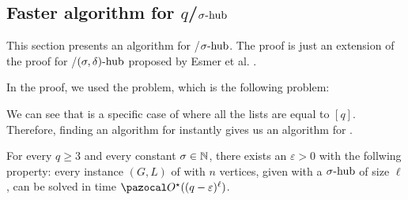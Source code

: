 \subsection{Faster algorithm for $q$/$\sigma\text{-hub}$}
\label{section:qcol-shub}

This section presents an algorithm for /$\sigma\text{-hub}$. The proof is just an extension of the proof for /$(\sigma, \delta)\text{-hub}$ proposed by Esmer et al. \cite{esmer2024fundamental}.

\medskip

In the proof, we used the  problem, which is the following problem:

\begin{problem}
\end{problem}

We can see that  is a specific case of  where all the lists are equal to $[q]$. Therefore, finding an algorithm for  instantly gives us an algorithm for .

\medskip

\begin{theorem}
    For every $q \geq 3$ and every constant $\sigma \in \mathbb{N}$, there exists an $\varepsilon > 0$ with the follwing property: every instance $(G, L)$ of  with $n$ vertices, given with a $\sigma\text{-hub}$ of size $\ell$, can be solved in time $\O^\star((q-\varepsilon)^\ell)$.
\end{theorem}

